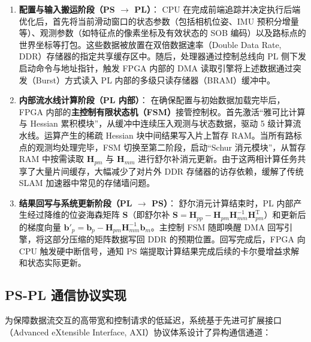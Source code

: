 \begin{enumerate}
    \item \textbf{配置与输入搬运阶段（PS $\rightarrow$ PL）}：
    CPU 在完成前端追踪并决定执行后端优化后，首先将当前滑动窗口的状态参数（包括相机位姿、IMU 预积分增量等）、观测参数（如特征点的像素坐标及有效状态的 SOB 编码）以及路标点的世界坐标等打包。这些数据被放置在双倍数据速率（Double Data Rate, DDR）存储器的指定共享缓存区中。随后，处理器通过控制总线向 PL 侧下发启动命令与地址指针，触发 FPGA 内部的 DMA 读取引擎将上述数据通过突发（Burst）方式读入 PL 内部的多级只读存储器（BRAM）缓冲中。

    \item \textbf{内部流水线计算阶段（PL 内部）}：
    在确保配置与初始数据加载完毕后，FPGA 内部的\textbf{主控制有限状态机（FSM）}接管控制权。首先激活“雅可比计算与 Hessian 累积模块”，从缓冲中连续压入观测与状态数据，驱动 5 级计算流水线。运算产生的稀疏 Hessian 块中间结果写入片上暂存 RAM。当所有路标点的观测均处理完毕，FSM 切换至第二阶段，启动“Schur 消元模块”，从暂存 RAM 中按需读取 $\mathbf{H}_{pm}$ 与 $\mathbf{H}_{mm}$ 进行舒尔补消元更新。由于这两相计算任务共享了大量片间缓存，大幅减少了对片外 DDR 存储器的访存依赖，缓解了传统 SLAM 加速器中常见的存储墙问题。

    \item \textbf{结果回写与系统更新阶段（PL $\rightarrow$ PS）}：
    舒尔消元计算结束时，PL 内部产生经过降维的位姿海森矩阵 $\mathbf{S}$（即舒尔补 $\mathbf{S} = \mathbf{H}_{pp} - \mathbf{H}_{pm}\mathbf{H}_{mm}^{-1}\mathbf{H}_{pm}^{\mathrm{T}}$）和更新后的梯度向量 $\mathbf{b}'_p = \mathbf{b}_p - \mathbf{H}_{pm}\mathbf{H}_{mm}^{-1}\mathbf{b}_m$。主控制 FSM 随即唤醒 DMA 回写引擎，将这部分压缩的矩阵数据写回 DDR 的预期位置。回写完成后，FPGA 向 CPU 触发硬中断信号，通知 PS 端提取计算结果完成后续的卡尔曼增益求解和状态实际更新。
\end{enumerate}

\subsection{PS-PL 通信协议实现}

为保障数据流交互的高带宽和控制请求的低延迟，系统基于先进可扩展接口（Advanced eXtensible Interface, AXI）协议体系设计了异构通信通道：

